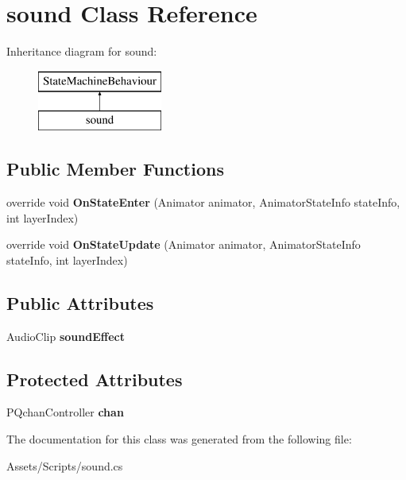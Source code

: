 \hypertarget{classsound}{}\section{sound Class Reference}
\label{classsound}
Inheritance diagram for sound\+:\begin{figure}[H]
\begin{center}
\leavevmode
\includegraphics[height=2.000000cm]{classsound}
\end{center}
\end{figure}
\subsection*{Public Member Functions}
\begin{DoxyCompactItemize}
\item 
override void {\bfseries On\+State\+Enter} (Animator animator, Animator\+State\+Info state\+Info, int layer\+Index)\hypertarget{classsound_a2e6970c535fadf7c146a8a5b06aca4ea}{}\label{classsound_a2e6970c535fadf7c146a8a5b06aca4ea}

\item 
override void {\bfseries On\+State\+Update} (Animator animator, Animator\+State\+Info state\+Info, int layer\+Index)\hypertarget{classsound_acb1dd2017bcf36ff10c66bddc49074c8}{}\label{classsound_acb1dd2017bcf36ff10c66bddc49074c8}

\end{DoxyCompactItemize}
\subsection*{Public Attributes}
\begin{DoxyCompactItemize}
\item 
Audio\+Clip {\bfseries sound\+Effect}\hypertarget{classsound_a240d4bcb27d12691404853bd07eda1e9}{}\label{classsound_a240d4bcb27d12691404853bd07eda1e9}

\end{DoxyCompactItemize}
\subsection*{Protected Attributes}
\begin{DoxyCompactItemize}
\item 
P\+Qchan\+Controller {\bfseries chan}\hypertarget{classsound_ae5d531a863726cffc00ad4cf26a1fa30}{}\label{classsound_ae5d531a863726cffc00ad4cf26a1fa30}

\end{DoxyCompactItemize}


The documentation for this class was generated from the following file\+:\begin{DoxyCompactItemize}
\item 
Assets/\+Scripts/sound.\+cs\end{DoxyCompactItemize}
